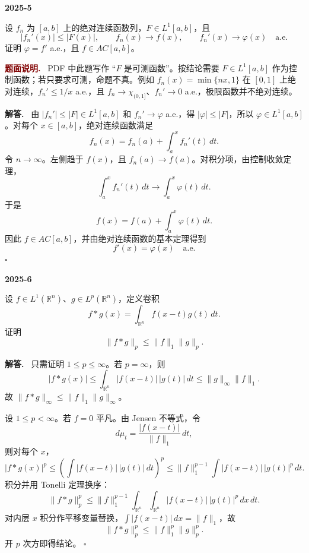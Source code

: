 \documentclass[UTF8]{ctexart}
\newcommand{\R}{\mathbb R}
\newenvironment{problem}[1]{\par\medskip\noindent\textbf{#1}\par\smallskip}{\par}
\newenvironment{solution}{\par\noindent\textbf{解答.}\ }{\hfill$\square$\par\medskip}
\newenvironment{noteenv}{\par\noindent\textcolor{Maroon}{\textbf{题面说明.}}\ }{\par\smallskip}
\begin{document}
\begin{problem}{2025-5}
设 \(f_n\) 为 \([a,b]\) 上的绝对连续函数列，\(F\in L^1[a,b]\)，且
\[
  |f_n'(x)|\le |F(x)|,\qquad f_n(x)\to f(x),\qquad f_n'(x)\to\varphi(x)\quad\text{a.e.}
\]
证明 \(\varphi=f'\) a.e.，且 \(f\in AC[a,b]\)。
\end{problem}
\begin{noteenv}
PDF 中此题写作 ``\(F\) 是可测函数''。按结论需要 \(F\in L^1[a,b]\) 作为控制函数；若只要求可测，命题不真。例如
\(f_n(x)=\min\{nx,1\}\) 在 \([0,1]\) 上绝对连续，\(f_n'\le 1/x\) a.e.，且
\(f_n\to\chi_{(0,1]}\)、\(f_n'\to0\) a.e.，极限函数并不绝对连续。
\end{noteenv}
\begin{solution}
由 \(|f_n'|\le |F|\in L^1[a,b]\) 和 \(f_n'\to\varphi\) a.e.，得 \(|\varphi|\le |F|\)，所以
\(\varphi\in L^1[a,b]\)。对每个 \(x\in[a,b]\)，绝对连续函数满足
\[
  f_n(x)=f_n(a)+\int_a^x f_n'(t)\,dt.
\]
令 \(n\to\infty\)。左侧趋于 \(f(x)\)，且 \(f_n(a)\to f(a)\)。对积分项，由控制收敛定理，
\[
  \int_a^x f_n'(t)\,dt\to \int_a^x \varphi(t)\,dt.
\]
于是
\[
  f(x)=f(a)+\int_a^x\varphi(t)\,dt.
\]
因此 \(f\in AC[a,b]\)，并由绝对连续函数的基本定理得到
\[
  f'(x)=\varphi(x)\quad\text{a.e.}
\]
\end{solution}

\begin{problem}{2025-6}
设 \(f\in L^1(\R^n)\)、\(g\in L^p(\R^n)\)，定义卷积
\[
  f*g(x)=\int_{\R^n}f(x-t)g(t)\,dt.
\]
证明
\[
  \|f*g\|_p\le \|f\|_1\|g\|_p.
\]
\end{problem}
\begin{solution}
只需证明 \(1\le p\le\infty\)。若 \(p=\infty\)，则
\[
  |f*g(x)|
  \le\int_{\R^n}|f(x-t)|\,|g(t)|\,dt
  \le \|g\|_\infty\|f\|_1.
\]
故 \(\|f*g\|_\infty\le\|f\|_1\|g\|_\infty\)。

设 \(1\le p<\infty\)。若 \(f=0\) 平凡。由 Jensen 不等式，令
\[
  d\mu_t=\frac{|f(x-t)|}{\|f\|_1}\,dt,
\]
则对每个 \(x\)，
\[
  |f*g(x)|^p
  \le \left(\int |f(x-t)|\,|g(t)|\,dt\right)^p
  \le \|f\|_1^{p-1}\int |f(x-t)|\,|g(t)|^p\,dt.
\]
积分并用 Tonelli 定理换序：
\[
  \|f*g\|_p^p
  \le \|f\|_1^{p-1}
  \int_{\R^n}\int_{\R^n}|f(x-t)|\,|g(t)|^p\,dx\,dt.
\]
对内层 \(x\) 积分作平移变量替换，\(\int |f(x-t)|\,dx=\|f\|_1\)，故
\[
  \|f*g\|_p^p\le \|f\|_1^p\|g\|_p^p.
\]
开 \(p\) 次方即得结论。
\end{solution}
\end{document}

